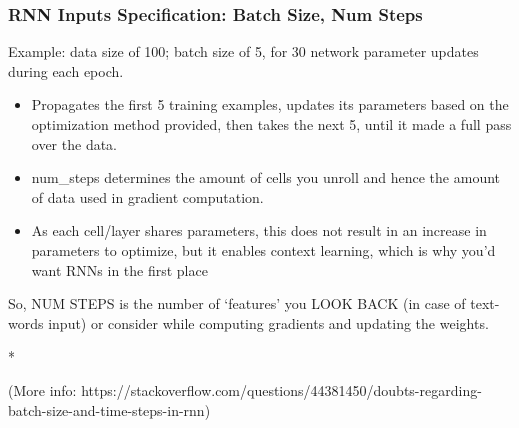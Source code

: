 \begin{frame}[fragile] \frametitle{RNN Inputs Specification: Batch Size, Num Steps}
Example: data size of 100; batch size of 5, for 30 network parameter updates during each epoch. 
\begin{itemize}
\item Propagates the first 5 training examples, updates its parameters based on the optimization method provided, then takes the next 5, until it made a full pass over the data. 
\item num\_steps determines the amount of cells you unroll and hence the amount of data used in gradient computation. 
\item As each cell/layer shares parameters, this does not result in an increase in parameters to optimize, but it enables context learning, which is why you'd want RNNs in the first place
\end{itemize}
So, NUM STEPS is the number of `features' you LOOK BACK (in case of text-words input) or consider while computing gradients and updating the weights.

*

{\tiny (More info: https://stackoverflow.com/questions/44381450/doubts-regarding-batch-size-and-time-steps-in-rnn)}

\end{frame}



